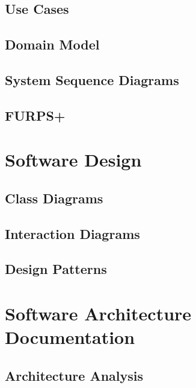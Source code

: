 \documentclass[a4paper,11pt]{article}
\begin{document}
\subsection{Use Cases}


\subsection{Domain Model}


\subsection{System Sequence Diagrams}


\subsection{FURPS+}


\pagebreak
\section{Software Design}


\subsection{Class Diagrams}


\subsection{Interaction Diagrams}


\subsection{Design Patterns}


\pagebreak
\section{Software Architecture Documentation}


\subsection{Architecture Analysis}

\end{document}
